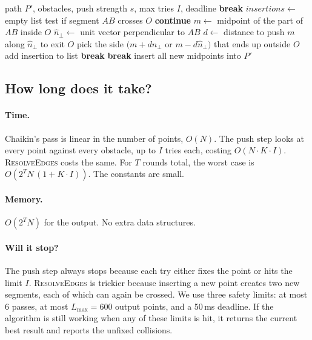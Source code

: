 \documentclass[10pt,a4paper,twocolumn]{article}
\begin{document}
\begin{algorithm}[t]\small
\caption{ResolveEdges}\label{alg:resolveedges}
\begin{algorithmic}[1]
\Require path $P'$, obstacles, push strength $s$, max tries $I$, deadline
   \textbf{break} \EndIf
  \State $\mathit{insertions} \gets$ empty list
      \State test if segment $AB$ crosses $O$
       \textbf{continue} \EndIf
      \State $m \gets$ midpoint of the part of $AB$ inside $O$
      \State $\hat{n}_\perp \gets$ unit vector perpendicular to $AB$
      \State $d \gets$ distance to push $m$ along $\hat{n}_\perp$ to exit $O$
      \State pick the side $(m{+}d\hat{n}_\perp$ or $m{-}d\hat{n}_\perp)$
             that ends up outside $O$
      \State add insertion to list
      \State \textbf{break}
    \EndFor
  \EndFor
   \textbf{break} \EndIf
  \State insert all new midpoints into $P'$
\EndFor
\end{algorithmic}
\end{algorithm}

\subsection{How long does it take?}
\paragraph*{Time.} Chaikin's pass is linear in the number of points,
$O(N)$. The push step looks at every point against every obstacle, up
to $I$ tries each, costing $O(N\!\cdot\!K\!\cdot\!I)$.
\textsc{ResolveEdges} costs the same. For $T$ rounds total, the worst
case is $O(2^T\!N\,(1+K\!\cdot\!I))$. The constants are small.

\paragraph*{Memory.} $O(2^T\!N)$ for the output. No extra data
structures.

\paragraph*{Will it stop?} The push step always stops because each try
either fixes the point or hits the limit $I$. \textsc{ResolveEdges} is
trickier because inserting a new point creates two new segments, each
of which can again be crossed. We use three safety limits: at most $6$
passes, at most $L_{\max}{=}600$ output points, and a 50\,ms deadline.
If the algorithm is still working when any of these limits is hit, it
returns the current best result and reports the unfixed collisions.
\end{document}
